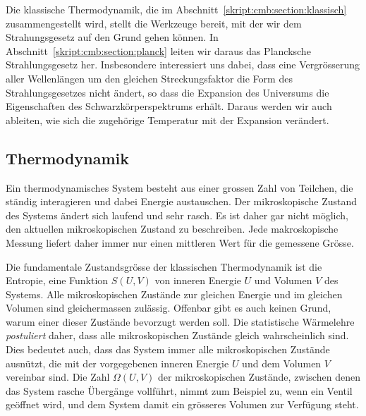 Die klassische Thermodynamik, die im
Abschnitt~\ref{skript:cmb:section:klassisch} zusammengestellt wird,
stellt die Werkzeuge bereit, mit der wir
dem Strahungsgesetz auf den Grund gehen können.
In Abschnitt~\ref{skript:cmb:section:planck} leiten wir daraus
das Plancksche Strahlungsgesetz her.
Insbesondere interessiert uns dabei, dass eine Vergrösserung aller
Wellenlängen um den gleichen Streckungsfaktor die Form des
Strahlungsgesetzes nicht ändert, so dass die Expansion des Universums
die Eigenschaften des Schwarzkörperspektrums erhält.
Daraus werden wir auch ableiten, wie sich die zugehörige Temperatur
mit der Expansion verändert.


\subsection{Thermodynamik%
\label{skript:cmb:section:klassisch}}
%
Ein thermodynamisches System besteht aus einer grossen Zahl von 
Teilchen, die ständig interagieren und dabei Energie austauschen.
Der mikroskopische Zustand des Systems ändert sich laufend
und sehr rasch.
%
%
Es ist daher gar nicht möglich, den aktuellen mikroskopischen
Zustand zu beschreiben.
Jede makroskopische Messung liefert daher immer nur einen mittleren
Wert für die gemessene Grösse.

Die fundamentale Zustandsgrösse der klassischen Thermodynamik ist
die Entropie, eine Funktion $S(U,V)$ von inneren Energie $U$ und 
Volumen $V$ des Systems. 
%
Alle mikroskopischen Zustände zur gleichen Energie und im gleichen
Volumen sind gleichermassen zulässig.
Offenbar gibt es auch keinen Grund, warum einer dieser Zustände
bevorzugt werden soll.
Die statistische Wärmelehre
%
{\em postuliert} daher, dass alle mikroskopischen Zustände gleich
wahrscheinlich sind.
Dies bedeutet auch, dass das System immer alle mikroskopischen
Zustände ausnützt, die mit der vorgegebenen inneren Energie $U$ und
dem Volumen $V$ vereinbar sind.
Die Zahl $\Omega(U,V)$ der mikroskopischen Zustände, zwischen denen das
System rasche Übergänge vollführt, nimmt zum Beispiel zu, wenn ein
Ventil geöffnet wird, und dem System damit ein grösseres Volumen
zur Verfügung steht.

